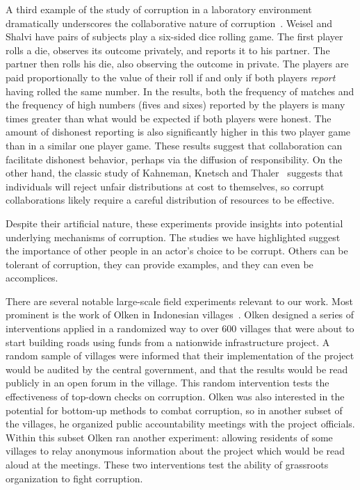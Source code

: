 A third example of the study of corruption in a laboratory environment dramatically underscores the collaborative nature of corruption~\cite{weisel2015collaborative}. Weisel and Shalvi have pairs of subjects play a six-sided dice rolling game. The first player rolls a die, observes its outcome privately, and reports it to his partner. The partner then rolls his die, also observing the outcome in private. The players are paid proportionally to the value of their roll if and only if both players \textit{report} having rolled the same number. In the results, both the frequency of matches and the frequency of high numbers (fives and sixes) reported by the players is many times greater than what would be expected if both players were honest. The amount of dishonest reporting is also significantly higher in this two player game than in a similar one player game. These results suggest that collaboration can facilitate dishonest behavior, perhaps via the diffusion of responsibility. On the other hand, the classic study of Kahneman, Knetsch and Thaler~\cite{kahneman1986fairness} suggests that individuals will reject unfair distributions at cost to themselves, so corrupt collaborations likely require a careful distribution of resources to be effective.

Despite their artificial nature, these experiments provide insights into potential underlying mechanisms of corruption. The studies we have highlighted suggest the importance of other people in an actor's choice to be corrupt. Others can be tolerant of corruption, they can provide examples, and they can even be accomplices. 

There are several notable large-scale field experiments relevant to our work. Most prominent is the work of Olken in Indonesian villages~\cite{olken2007monitoring}. Olken designed a series of interventions applied in a randomized way to over 600 villages that were about to start building roads using funds from a nationwide infrastructure project. A random sample of villages were informed that their implementation of the project would be audited by the central government, and that the results would be read publicly in an open forum in the village. This random intervention tests the effectiveness of top-down checks on corruption. Olken was also interested in the potential for bottom-up methods to combat corruption, so in another subset of the villages, he organized public accountability meetings with the project officials. Within this subset Olken ran another experiment: allowing residents of some villages to relay anonymous information about the project which would be read aloud at the meetings. These two interventions test the ability of grassroots organization to fight corruption. 

